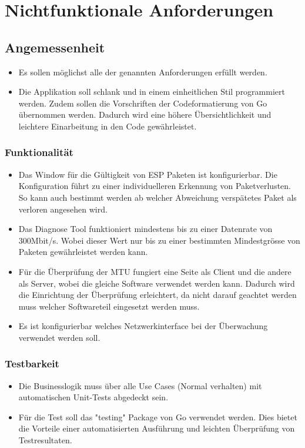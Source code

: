 \section{Nichtfunktionale Anforderungen}
\label{sec:Nichtfunktionale Anforderungen}

\subsection{Angemessenheit}
\begin{itemize}
	\item Es sollen möglichst alle der genannten Anforderungen erfüllt werden.
	\item Die Applikation soll schlank und in einem einheitlichen Stil programmiert werden. Zudem sollen die Vorschriften der Codeformatierung von Go übernommen werden. Dadurch wird eine höhere Übersichtlichkeit und leichtere Einarbeitung in den Code gewährleistet.
\end{itemize}

\subsubsection{Funktionalität}
\begin{itemize}
\item Das Window für die Gültigkeit von ESP Paketen ist konfigurierbar. Die Konfiguration führt zu einer individuelleren Erkennung von Paketverlusten. So kann auch bestimmt werden ab welcher Abweichung verspätetes Paket als verloren angesehen wird.
\item Das Diagnose Tool funktioniert mindestens bis zu einer Datenrate von 300Mbit/s. Wobei dieser Wert nur bis zu einer bestimmten Mindestgrösse von Paketen gewährleistet werden kann.
\item Für die Überprüfung der \acs{MTU} fungiert eine Seite als Client und die andere als Server, wobei die gleiche Software verwendet werden kann. Dadurch wird die Einrichtung der Überprüfung erleichtert, da nicht darauf geachtet werden muss welcher Softwareteil eingesetzt werden muss.
\item Es ist konfigurierbar welches Netzwerkinterface bei der Überwachung verwendet werden soll.
\end{itemize}

\subsubsection{Testbarkeit}
\begin{itemize}
\item Die Businesslogik muss über alle Use Cases (Normal verhalten) mit automatischen Unit-Tests abgedeckt sein.
\item Für die Test soll das "testing" Package von Go verwendet werden. Dies bietet die Vorteile einer automatisierten Ausführung und leichten Überprüfung von Testresultaten.
\end{itemize}

